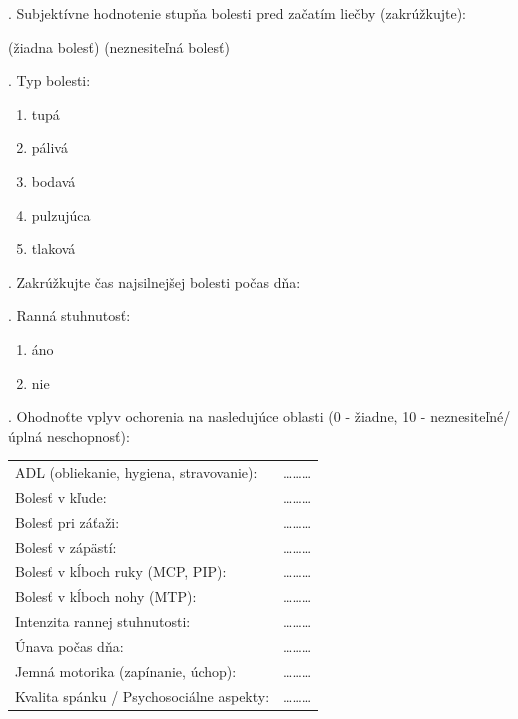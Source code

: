 \clearpage

. Subjektívne hodnotenie stupňa bolesti pred začatím liečby (zakrúžkujte):

\noindent (žiadna bolesť) \hfill (neznesiteľná bolesť)
\begin{center}
\end{center}

. Typ bolesti:
\begin{enumerate}[label=\arabic*.]
    \item tupá
    \item pálivá
    \item bodavá
    \item pulzujúca
    \item tlaková
\end{enumerate}

. Zakrúžkujte čas najsilnejšej bolesti počas dňa:
\begin{center}
\end{center}

. Ranná stuhnutosť:
\begin{enumerate}[label=\arabic*.]
    \item áno
    \item nie
\end{enumerate}

\clearpage

. Ohodnoťte vplyv ochorenia na nasledujúce oblasti (0 - žiadne, 10 - neznesiteľné/úplná neschopnosť):

\begin{table}[H]
\centering
\begin{tabular}{p{8cm} c}
ADL (obliekanie, hygiena, stravovanie): & \dots\dots\dots \\
Bolesť v kľude: & \dots\dots\dots \\
Bolesť pri záťaži: & \dots\dots\dots \\
Bolesť v zápästí: & \dots\dots\dots \\
Bolesť v kĺboch ruky (MCP, PIP): & \dots\dots\dots \\
Bolesť v kĺboch nohy (MTP): & \dots\dots\dots \\
Intenzita rannej stuhnutosti: & \dots\dots\dots \\
Únava počas dňa: & \dots\dots\dots \\
Jemná motorika (zapínanie, úchop): & \dots\dots\dots \\
Kvalita spánku / Psychosociálne aspekty: & \dots\dots\dots \\
\end{tabular}
\end{table}


